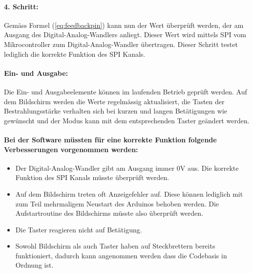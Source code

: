 \paragraph{4. Schritt:}
Gemäss Formel (\ref{eq:feedbackpin}) kann nun der Wert überprüft werden, der am Ausgang des Digital-Analog-Wand\-lers anliegt. Dieser Wert wird mittels SPI vom Mikrocontroller zum Digital-Analog-Wand\-ler übertragen. Dieser Schritt testet lediglich die korrekte Funktion des SPI Kanals.

\paragraph{Ein- und Ausgabe:}
Die Ein- und Ausgabeelemente können im laufenden Betrieb geprüft werden. Auf dem Bildschirm werden die Werte regelmässig aktualisiert, die Tasten der Bestrahlungsstärke verhalten sich bei kurzen und langen Betätigungen wie gewünscht und der Modus kann mit dem entsprechenden Taster geändert werden.

\paragraph{Bei der Software müssten für eine korrekte Funktion folgende Verbesserungen vorgenommen werden:}
\begin{itemize}
	\item Der Digital-Analog-Wandler gibt am Ausgang immer 0V aus. Die korrekte Funktion des SPI Kanals müsste überprüft werden.
	\item Auf dem Bildschirm treten oft Anzeigefehler auf. Diese können lediglich mit zum Teil mehrmaligem Neustart des Arduinos behoben werden. Die Aufstartroutine des Bildschirms müsste also überprüft werden.
	\item Die Taster reagieren nicht auf Betätigung.
	\item Sowohl Bildschirm als auch Taster haben auf Steckbrettern bereits funktioniert, dadurch kann angenommen werden dass die Codebasis in Ordnung ist.
\end{itemize}
